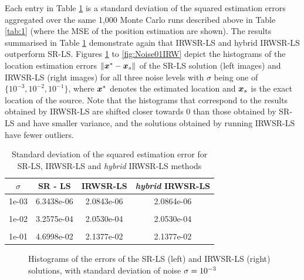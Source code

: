 Each entry in Table \ref{tab:2} is a standard deviation of the squared  estimation errors  aggregated over the  same 1,000 Monte Carlo runs described above in Table \ref{tab:1} (where the MSE of the position estimation are shown). The results summarised in Table \ref{tab:2} demonstrate again that IRWSR-LS and hybrid IRWSR-LS outperform SR-LS. Figures \ref{fig:Noise03IRW} to \ref{fig:Noise01IRW} depict the histograms of the location estimation errors $\|\mbox{\boldmath$x$}^* - \mbox{\boldmath$x$}_s\|$ of the SR-LS solution (left images) and IRWSR-LS (right images) for all three noise levels with $\sigma$ being one of $\{10^{-3}, 10^{-2}, 10^{-1}\}$, where $\mbox{\boldmath$x$}^*$ denotes the estimated location and $\mbox{\boldmath$x$}_s$ is the exact location of the source. Note that the histograms that correspond to the results obtained by IRWSR-LS are shifted closer towards $0$ than those obtained by SR-LS and have smaller variance, and the solutions obtained by running IRWSR-LS have fewer outliers.


\begin{table}[h]
\centering
\caption{Standard deviation of the squared estimation error for SR-LS, IRWSR-LS and \textit{hybrid} IRWSR-LS methods}
\phantom{m}
\begin{tabular}{|c|c|c|c|} \hline
$\sigma$ & SR - LS & IRWSR-LS & \textit{hybrid} IRWSR-LS \\ \hline
1e-03&	6.3438e-06&	2.0843e-06 & 2.0864e-06\\ &&&\\
1e-02&	3.2575e-04&	2.0530e-04 & 2.0530e-04\\ &&&\\
1e-01&	4.6998e-02&	2.1377e-02 & 2.1377e-02\\ %
\hline
\end{tabular}
\label{tab:2}
\end{table}

\begin{figure}%
\centering
\caption{Histograms of the errors of the SR-LS (left) and IRWSR-LS (right) solutions, with standard deviation of noise $\protect\sigma = 10^{-3}$}
\label{fig:Noise03IRW}
\end{figure}

